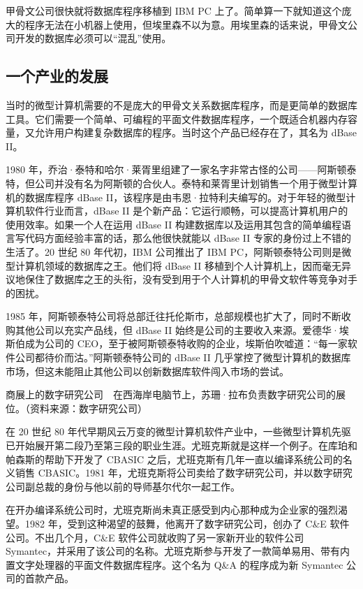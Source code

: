 \documentclass[12pt,UTF8]{ctexbook}
\begin{document}
甲骨文公司很快就将数据库程序移植到 IBM PC 上了。简单算一下就知道这个庞大的程序无法在小机器上使用，但埃里森不以为意。用埃里森的话来说，甲骨文公司开发的数据库必须可以“混乱”使用。





\subsection{一个产业的发展}


当时的微型计算机需要的不是庞大的甲骨文关系数据库程序，而是更简单的数据库工具。它们需要一个简单、可编程的平面文件数据库程序，一个既适合机器内存容量，又允许用户构建复杂数据库的程序。当时这个产品已经存在了，其名为 dBase II。

1980 年，乔治·泰特和哈尔·莱胥里组建了一家名字非常古怪的公司——阿斯顿泰特，但公司并没有名为阿斯顿的合伙人。泰特和莱胥里计划销售一个用于微型计算机的数据库程序 dBase II，该程序是由韦恩·拉特利夫编写的。对于年轻的微型计算机软件行业而言，dBase II 是个新产品：它运行顺畅，可以提高计算机用户的使用效率。如果一个人在运用 dBase II 构建数据库以及运用其包含的简单编程语言写代码方面经验丰富的话，那么他很快就能以 dBase II 专家的身份过上不错的生活了。20 世纪 80 年代初，IBM 公司推出了 IBM PC，阿斯顿泰特公司则是微型计算机领域的数据库之王。他们将 dBase II 移植到个人计算机上，因而毫无异议地保住了数据库之王的头衔，没有受到用于个人计算机的甲骨文软件等竞争对手的困扰。

1985 年，阿斯顿泰特公司将总部迁往托伦斯市，总部规模也扩大了，同时不断收购其他公司以充实产品线，但 dBase II 始终是公司的主要收入来源。爱德华·埃斯伯成为公司的 CEO，至于被阿斯顿泰特收购的企业，埃斯伯吹嘘道：“每一家软件公司都待价而沽。”阿斯顿泰特公司的 dBase II 几乎掌控了微型计算机的数据库市场，但这未能阻止其他公司以创新数据库软件闯入市场的尝试。



商展上的数字研究公司　在西海岸电脑节上，苏珊·拉布负责数字研究公司的展位。（资料来源：数字研究公司）

在 20 世纪 80 年代早期风云万变的微型计算机软件产业中，一些微型计算机先驱已开始展开第二段乃至第三段的职业生涯。尤班克斯就是这样一个例子。在库珀和帕森斯的帮助下开发了 CBASIC 之后，尤班克斯有几年一直以编译系统公司的名义销售 CBASIC。1981 年，尤班克斯将公司卖给了数字研究公司，并以数字研究公司副总裁的身份与他以前的导师基尔代尔一起工作。

在开办编译系统公司时，尤班克斯尚未真正感受到内心那种成为企业家的强烈渴望。1982 年，受到这种渴望的鼓舞，他离开了数字研究公司，创办了 C\&E 软件公司。不出几个月，C\&E 软件公司就收购了另一家新开业的软件公司 Symantec，并采用了该公司的名称。尤班克斯参与开发了一款简单易用、带有内置文字处理器的平面文件数据库程序。这个名为 Q\&A 的程序成为新 Symantec 公司的首款产品。
\end{document}
